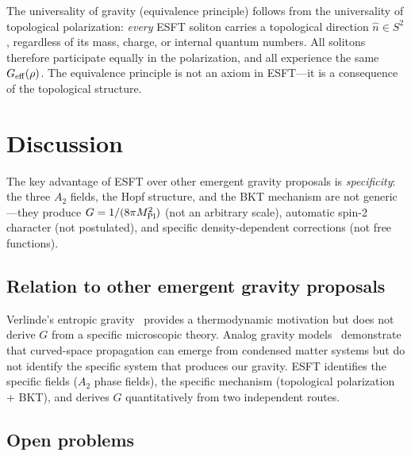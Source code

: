 ﻿\documentclass[twocolumn,preprintnumbers,amsmath,amssymb,prd]{revtex4-2}
\begin{document}
The universality of gravity (equivalence principle) follows from the universality of topological polarization: \emph{every} ESFT soliton carries a topological direction $\hat{n} \in S^2$, regardless of its mass, charge, or internal quantum numbers. All solitons therefore participate equally in the polarization, and all experience the same $G_{\rm eff}(\rho)$. The equivalence principle is not an axiom in ESFT---it is a consequence of the topological structure.

\section{Discussion}
\label{sec:discussion}

The key advantage of ESFT over other emergent gravity proposals is \textit{specificity}: the three $A_2$ fields, the Hopf structure, and the BKT mechanism are not generic---they produce $G = 1/(8\pi M_{\rm Pl}^2)$ (not an arbitrary scale), automatic spin-2 character (not postulated), and specific density-dependent corrections (not free functions).

\subsection{Relation to other emergent gravity proposals}

Verlinde's entropic gravity~\cite{Verlinde2011} provides a thermodynamic motivation but does not derive $G$ from a specific microscopic theory. Analog gravity models~\cite{Barcelo2005} demonstrate that curved-space propagation can emerge from condensed matter systems but do not identify the specific system that produces our gravity. ESFT identifies the specific fields ($A_2$ phase fields), the specific mechanism (topological polarization + BKT), and derives $G$ quantitatively from two independent routes.

\subsection{Open problems}
\end{document}
